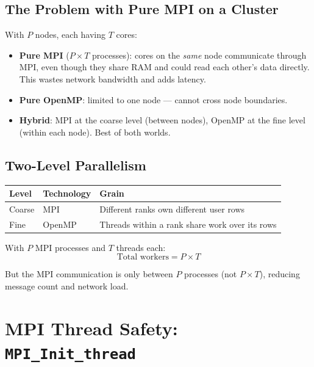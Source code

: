 \documentclass[12pt,a4paper]{article}
\begin{document}
\subsection{The Problem with Pure MPI on a Cluster}

With $P$ nodes, each having $T$ cores:

\begin{itemize}
    \item \textbf{Pure MPI} ($P \times T$ processes): cores on the
          \emph{same} node communicate through MPI, even though they share
          RAM and could read each other's data directly.  This wastes network
          bandwidth and adds latency.
    \item \textbf{Pure OpenMP}: limited to one node — cannot cross node
          boundaries.
    \item \textbf{Hybrid}: MPI at the coarse level (between nodes), OpenMP at
          the fine level (within each node).  Best of both worlds.
\end{itemize}

\subsection{Two-Level Parallelism}

\begin{center}
\begin{tabular}{lll}
\toprule
Level & Technology & Grain \\
\midrule
Coarse & MPI & Different ranks own different user rows \\
Fine & OpenMP & Threads within a rank share work over its rows \\
\bottomrule
\end{tabular}
\end{center}

With $P$ MPI processes and $T$ threads each:
\[
\text{Total workers} = P \times T
\]

But the MPI communication is only between $P$ processes (not $P \times T$),
reducing message count and network load.

\section{MPI Thread Safety: \texttt{MPI\_Init\_thread}}
\end{document}
